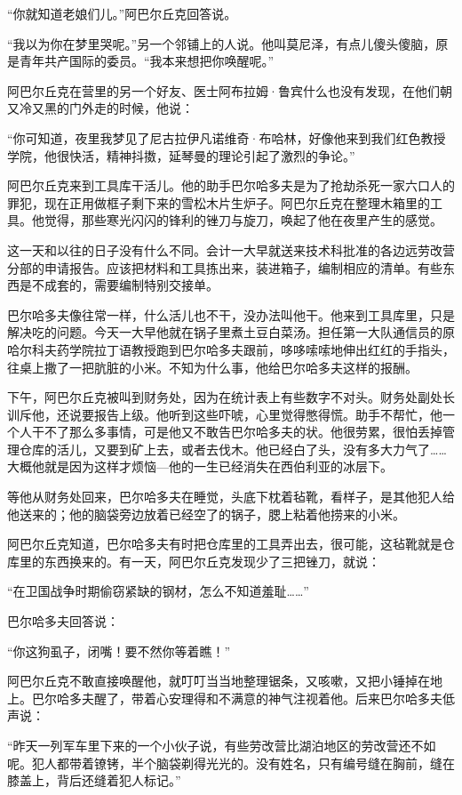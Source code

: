 “你就知道老娘们儿。”阿巴尔丘克回答说。

“我以为你在梦里哭呢。”另一个邻铺上的人说。他叫莫尼泽，有点儿傻头傻脑，原是青年共产国际的委员。“我本来想把你唤醒呢。”

阿巴尔丘克在营里的另一个好友、医士阿布拉姆·鲁宾什么也没有发现，在他们朝又冷又黑的门外走的时候，他说：

“你可知道，夜里我梦见了尼古拉伊凡诺维奇·布哈林，好像他来到我们红色教授学院，他很快活，精神抖擞，延琴曼的理论引起了激烈的争论。”

阿巴尔丘克来到工具库干活儿。他的助手巴尔哈多夫是为了抢劫杀死一家六口人的罪犯，现在正用做框子剩下来的雪松木片生炉子。阿巴尔丘克在整理木箱里的工具。他觉得，那些寒光闪闪的锋利的锉刀与旋刀，唤起了他在夜里产生的感觉。

这一天和以往的日子没有什么不同。会计一大早就送来技术科批准的各边远劳改营分部的申请报告。应该把材料和工具拣出来，装进箱子，编制相应的清单。有些东西是不成套的，需要编制特别交接单。

巴尔哈多夫像往常一样，什么活儿也不干，没办法叫他干。他来到工具库里，只是解决吃的问题。今天一大早他就在锅子里煮土豆白菜汤。担任第一大队通信员的原哈尔科夫药学院拉丁语教授跑到巴尔哈多夫跟前，哆哆嗦嗦地伸出红红的手指头，往桌上撒了一把肮脏的小米。不知为什么事，他给巴尔哈多夫这样的报酬。

下午，阿巴尔丘克被叫到财务处，因为在统计表上有些数字不对头。财务处副处长训斥他，还说要报告上级。他听到这些吓唬，心里觉得憋得慌。助手不帮忙，他一个人干不了那么多事情，可是他又不敢告巴尔哈多夫的状。他很劳累，很怕丢掉管理仓库的活儿，又要到矿上去，或者去伐木。他已经白了头，没有多大力气了……大概他就是因为这样才烦恼—他的一生已经消失在西伯利亚的冰层下。

等他从财务处回来，巴尔哈多夫在睡觉，头底下枕着毡靴，看样子，是其他犯人给他送来的；他的脑袋旁边放着已经空了的锅子，腮上粘着他捞来的小米。

阿巴尔丘克知道，巴尔哈多夫有时把仓库里的工具弄出去，很可能，这毡靴就是仓库里的东西换来的。有一天，阿巴尔丘克发现少了三把锉刀，就说：

“在卫国战争时期偷窃紧缺的钢材，怎么不知道羞耻……”

巴尔哈多夫回答说：

“你这狗虱子，闭嘴！要不然你等着瞧！”

阿巴尔丘克不敢直接唤醒他，就叮叮当当地整理锯条，又咳嗽，又把小锤掉在地上。巴尔哈多夫醒了，带着心安理得和不满意的神气注视着他。后来巴尔哈多夫低声说：

“昨天一列军车里下来的一个小伙子说，有些劳改营比湖泊地区的劳改营还不如呢。犯人都带着镣铐，半个脑袋剃得光光的。没有姓名，只有编号缝在胸前，缝在膝盖上，背后还缝着犯人标记。”

